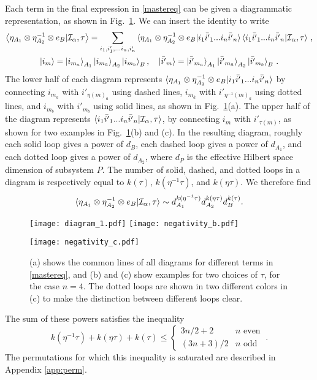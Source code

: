 \documentclass[a4paper,11pt]{article}
\newcommand\vev[1]{{\ensuremath{\left\langle{#1}\right\rangle}}}
\newcommand{\be}{\begin{equation}}
\newcommand{\ee}{\end{equation}}
\newcommand\al{{\alpha}}
\newcommand\sI{{\ensuremath{{\mathcal I}}}}
\begin{document}
Each term in the final expression in \eqref{mastereq} can be given a diagrammatic representation, as shown in Fig.~\ref{fig:negativity_figs}. We can insert the identity to write 
\be 
\label{negativity_diag}
\begin{gathered} 
\vev{\eta_{A_1} \otimes \eta^{-1}_{A_2} \otimes e_{B} | \sI_\al , \tau} = \sum_{i_1, i'_1, ... i_n, i'_n} \braket{\eta_{A_1} \otimes \eta^{-1}_{A_2} \otimes e_{B}|i_1 \bar{i'}_1 ... i_n \bar{i'}_n} \braket{i_1 \bar{i'}_1 ... i_n \bar{i'}_n| \sI_{\al}, \tau} \, , \\
\ket{i_m} = \ket{i_{m_a}}_{A_1} \ket{i_{m_{\bar{a}}}}_{A_2} \ket{i_{m_b}}_B, \quad \ket{\bar{i'}_m} = \ket{\bar{i'}_{m_a}}_{A_1} \ket{\bar{i'}_{m_{\bar{a}}}}_{A_2} \ket{\bar{i'}_{m_b}}_B \,.
\end{gathered} 
\ee
 The lower half of each diagram represents $\braket{\eta_{A_1} \otimes \eta^{-1}_{A_2} \otimes e_{B}|i_1 \bar{i'}_1 ... i_n \bar{i'}_n}$ by connecting $i_{m_a}$ with $i'_{\eta(m)_a}$ using dashed lines, $i_{m_{\bar{a}}}$ with $i'_{\eta^{-1}(m)_{\bar{a}}}$ using dotted lines, and $i_{m_b}$ with $i'_{m_b}$ using solid lines, as shown in Fig.~\ref{fig:negativity_figs}(a). The upper half of the diagram represents 
$\braket{i_1 \bar{i'}_1 ... i_n \bar{i'}_n| \sI_{\al}, \tau}$, by connecting $i_m$ with $i'_{\tau(m)}$, as shown for two examples in Fig.~\ref{fig:negativity_figs}(b) and (c). In the resulting diagram, roughly each solid loop gives a power of $d_{B}$, each dashed loop gives a power of $d_{A_1}$, and each dotted loop gives a power of $d_{A_2}$, where $d_P$ is the effective Hilbert space dimension of subsystem $P$. The number of solid, dashed, and dotted loops in a diagram is respectively equal to $k(\tau)$, $k(\eta^{-1}\tau)$, and $k(\eta \tau)$. 
 We therefore find 
\be 
\braket{\eta_{A_1}\otimes \eta^{-1}_{A_2}\otimes e_{B}| \sI_{\al}, \tau}\sim d_{A_1}^{k(\eta^{-1}\tau)}d_{A_2}^{k(\eta\tau)} d_{B}^{k(\tau)}.
\label{sat2}
\ee
\begin{figure}[]
 \centering
 \texttt{[image: diagram\_1.pdf]}
 \texttt{[image: negativity\_b.pdf]}
 
 \vspace{0.5cm}
 
 \texttt{[image: negativity\_c.pdf]}
 \caption{(a) shows the common lines of all diagrams for different terms in \eqref{mastereq}, and (b) and (c) show examples for two choices of $\tau$, for the case $n=4$. The dotted loops are shown in two different colors in (c) to make the distinction between different loops clear.}
 \label{fig:negativity_figs}
\end{figure}
The sum of these powers satisfies the inequality 
\be 
k(\eta^{-1}\tau)+ k(\eta\tau)+k(\tau) \leq \begin{cases} 3n/2+2 & n\text{ even}\\
(3n+3)/2 & n\text{ odd}
\end{cases} \ .
\ee
The permutations for which this inequality is saturated are described in Appendix \ref{app:perm}. 
\end{document}
